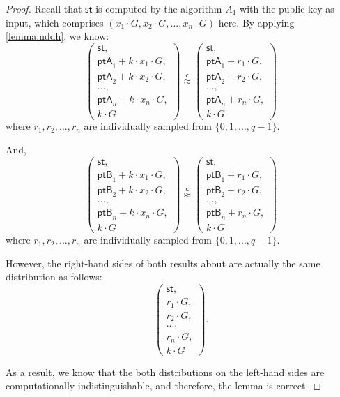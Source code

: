 \documentclass{article}
\begin{document}
\begin{proof}
    Recall that $\mathsf{st}$ is computed by the algorithm $A_1$ with the public key as input, which comprises $(x_1\cdot G, x_2\cdot G, ..., x_n\cdot G)$ here. By applying \autoref{lemma:nddh}, we know:
    \[
    \left(\begin{array}{r}
\mathsf{st},\\
\mathsf{ptA}_1+k\cdot x_1\cdot G,\\
\mathsf{ptA}_2+k\cdot x_2\cdot G,\\
...,\\
\mathsf{ptA}_n+k\cdot x_n\cdot G,\\
k\cdot G
\end{array}
\right)\stackrel{\mathsf{c}}{\approx}\left(\begin{array}{l}
\mathsf{st},\\
\mathsf{ptA}_1+r_1\cdot G,\\
\mathsf{ptA}_2+r_2\cdot G,\\
...,\\
\mathsf{ptA}_n+r_n\cdot G,\\
k\cdot G
\end{array}
\right)\]
where $r_1,r_2,...,r_n$ are individually sampled from $\{0,1,...,q-1\}$. 

And,
    \[
    \left(\begin{array}{r}
\mathsf{st},\\
\mathsf{ptB}_1+k\cdot x_1\cdot G,\\
\mathsf{ptB}_2+k\cdot x_2\cdot G,\\
...,\\
\mathsf{ptB}_n+k\cdot x_n\cdot G,\\
k\cdot G
\end{array}
\right)\stackrel{\mathsf{c}}{\approx}\left(\begin{array}{l}
\mathsf{st},\\
\mathsf{ptB}_1+r_1\cdot G,\\
\mathsf{ptB}_2+r_2\cdot G,\\
...,\\
\mathsf{ptB}_n+r_n\cdot G,\\
k\cdot G
\end{array}
\right)\]
where $r_1,r_2,...,r_n$ are individually sampled from $\{0,1,...,q-1\}$. 

However, the right-hand sides of both results about are actually the same distribution as follows:
\[
\left(\begin{array}{l}
\mathsf{st},\\
r_1\cdot G,\\
r_2\cdot G,\\
...,\\
r_n\cdot G,\\
k\cdot G
\end{array}
\right).\]

As a result, we know that the both distributions on the left-hand sides are computationally indistinguishable, and therefore, the lemma is correct. \end{proof}
\end{document}
